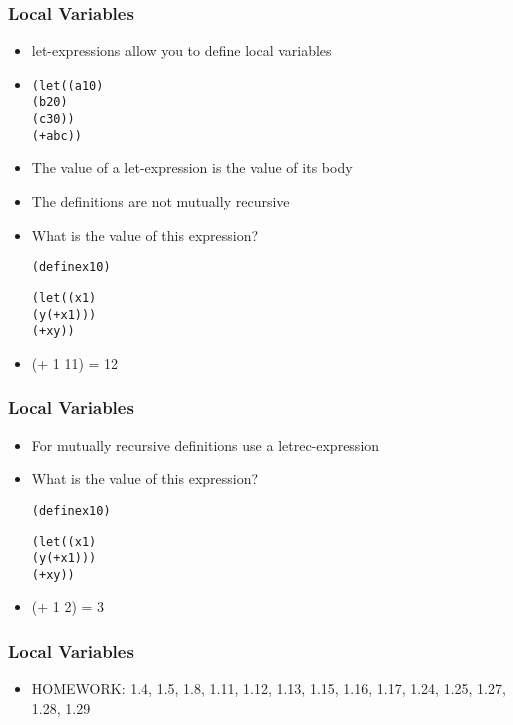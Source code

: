 \documentclass{beamer}
\begin{document}
\begin{frame}[fragile]
\frametitle{Local Variables}
\begin{scriptsize}
\begin{itemize}
\item<1-> let-expressions allow you to define local variables

\item<1->
\begin{alltt}
(let ((a 10)
      (b 20)
      (c 30))
  (+ a b c))
\end{alltt}

\item<1-> The value of a let-expression is the value of its body

\item<2-> The definitions are not mutually recursive

\item<2-> What is the value of this expression?
\begin{alltt}
(define x 10)

(let ((x 1)
      (y (+ x 1)))
  (+ x y))
\end{alltt}

\item<3-> (+ 1 11) = 12

\end{itemize}
\end{scriptsize}
\end{frame}

\begin{frame}[fragile]
\frametitle{Local Variables}
\begin{scriptsize}
\begin{itemize}
\item<1-> For mutually recursive definitions use a letrec-expression

\item<2-> What is the value of this expression?
\begin{alltt}
(define x 10)

(let ((x 1)
      (y (+ x 1)))
  (+ x y))
\end{alltt}

\item<3-> (+ 1 2) = 3

\end{itemize}
\end{scriptsize}
\end{frame}

\begin{frame}[fragile]
\frametitle{Local Variables}
\begin{scriptsize}
\begin{itemize}
\item<1-> HOMEWORK: 1.4, 1.5, 1.8, 1.11, 1.12, 1.13, 1.15, 1.16, 1.17, 1.24, 1.25, 1.27, 1.28, 1.29

\end{itemize}
\end{scriptsize}
\end{frame}
\end{document}
